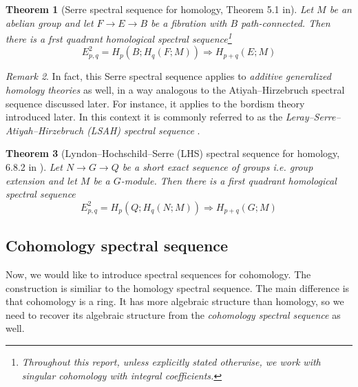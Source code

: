 \documentclass[a4paper,11pt]{article}
\newtheorem{theorem}{Theorem}[section]
\theoremstyle{definition}
\theoremstyle{remark}
\newtheorem{remark}[theorem]{Remark}
\begin{document}
\begin{theorem}[Serre spectral sequence for homology, Theorem 5.1 in\cite{mccleary2001user}] Let $M$ be an abelian group and let $F\to E\to B$ be a fibration with $B$ path-connected. Then there is a frst quadrant homological spectral sequence\footnote{Throughout this report, unless explicitly stated otherwise, we work with singular cohomology with integral coefficients.}
	\begin{equation}\label{eq:serre}
		E_{p,q}^2=H_p(B;H_q(F;M))\Rightarrow H_{p+q}(E;M)
	\end{equation}
\end{theorem}
\begin{remark}\label{LSAH}
	In fact, this Serre spectral sequence applies to {\itshape additive generalized homology theories} \cite[Definition 8.29]{davis2001lecture} as well, in a way analogous to the Atiyah--Hirzebruch spectral sequence discussed later. For instance, it applies to the bordism theory introduced later. In this context it is commonly referred to as the {\itshape Leray–Serre–Atiyah–Hirzebruch (LSAH) spectral sequence} \cite[Theorem 9.6]{davis2001lecture}.
\end{remark}
\begin{theorem}[Lyndon--Hochschild--Serre (LHS) spectral sequence for homology, 6.8.2 in \cite{weibel1994introduction}] Let $N\to G\to Q$ be a short exact sequence of groups i.e. group extension and let $M$ be a $G$-module. Then there is a first quadrant homological spectral sequence
\begin{equation}
E_{p,q}^2=H_p(Q;H_q(N;M))\Rightarrow H_{p+q}(G;M)
\end{equation}
\end{theorem}

\subsection{Cohomology spectral sequence}
Now, we would like to introduce spectral sequences for cohomology. The construction is similiar to the homology spectral sequence. The main difference is that cohomology is a ring. It has more algebraic structure than homology, so we need to recover its algebraic structure from the {\itshape cohomology spectral sequence} as well. 
\end{document}
